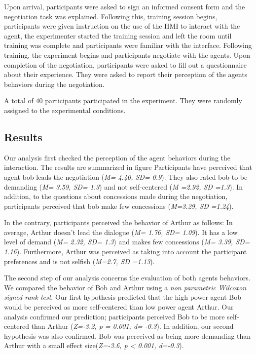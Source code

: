 \documentclass[runningheads,a4paper]{llncs}
\begin{document}
		
		Upon arrival, participants were asked to sign an informed consent form and the negotiation task was explained. Following this, training session begins, participants were given instruction on the use of the HMI to interact with the agent, the experimenter started the training session and left the room until training was complete and participants were familiar with the interface. Following training, the experiment begins and participants negotiate with the agents. Upon completion of the negotiation, participants were asked to fill out a questionnaire about their experience. They were asked to report their perception of the agents behaviors during the negotiation. 
	
	
		A total of 40 participants participated in the experiment. They were randomly assigned to the experimental conditions.%
		
		\subsection{Results}
		
		
		Our analysis first checked the perception of the agent behaviors during the interaction. The results are summarized in figure 
		Participants have perceived that agent bob leads the negotiation (\emph{M= 4.40, SD= 0.9}). They also rated bob to be demanding (\emph{M= 3.59, SD= 1.3}) and not self-centered (\emph{M =2.92, SD =1.3}). In addition, to the questions about concessions made during the negotiation, participants perceived that bob make few concessions (\emph{M=3.29, SD =1.24}).
		
		In the contrary, participants perceived the behavior of Arthur as follows: In average, Arthur doesn't lead the dialogue (\emph{M= 1.76, SD= 1.09}). It has a low level of demand (\emph{M= 2.32, SD= 1.3}) and makes few concessions (\emph{M= 3.39, SD= 1.16}). Furthermore, Arthur was perceived as taking into account the participant preferences and is not selfish (\emph{M=2.7, SD =1.13}).
		
		The second step of our analysis concerns the evaluation of both agents behaviors. We compared the behavior of Bob and Arthur using a \textit{non parametric Wilcoxon signed-rank test}. Our first hypothesis predicted that the high power agent Bob would be perceived as more self-centered than low power agent Arthur. Our analysis confirmed our prediction; participants perceived Bob to be more self-centered than Arthur (\emph{Z=-3.2, p = 0.001, d= -0.3}). In addition, our second hypothesis was also confirmed. Bob was perceived as being more demanding than Arthur with a small effect size(\emph{Z=-3.6, p < 0.001, d=-0.3}). 
		
\end{document}
